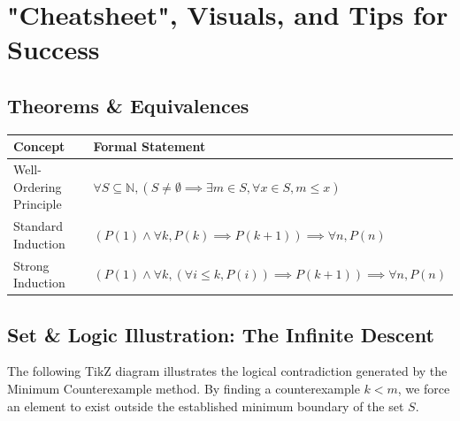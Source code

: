 \documentclass[11pt, a4paper]{article}
\theoremstyle{definition}
\theoremstyle{remark}
\newcommand{\N}{\mathbb{N}}
\begin{document}
\newpage
\section{"Cheatsheet", Visuals, and Tips for Success}

\subsection{Theorems \& Equivalences}
\renewcommand{\arraystretch}{1.5}
\noindent
\begin{tabularx}{\textwidth}{l X}
\toprule
\textbf{Concept} & \textbf{Formal Statement} \\
\midrule
Well-Ordering Principle & $\displaystyle \forall S \subseteq \N, (S \neq \emptyset \implies \exists m \in S, \forall x \in S, m \le x)$ \\
Standard Induction & $\displaystyle (P(1) \land \forall k, P(k) \implies P(k+1)) \implies \forall n, P(n)$ \\
Strong Induction & $\displaystyle (P(1) \land \forall k, (\forall i \le k, P(i)) \implies P(k+1)) \implies \forall n, P(n)$ \\
\bottomrule
\end{tabularx}
\vspace{1em}

\subsection{Set \& Logic Illustration: The Infinite Descent}
The following TikZ diagram illustrates the logical contradiction generated by the Minimum Counterexample method. By finding a counterexample $k < m$, we force an element to exist outside the established minimum boundary of the set $S$.
\end{document}
